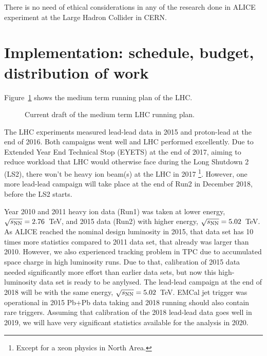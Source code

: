 There is no need of ethical considerations in any of the research done in ALICE experiment at the Large Hadron Collider in CERN.


\section{Implementation: schedule, budget, distribution of work} %
\label{sec:implementation}

Figure~\ref{fig:LHC-mid-term} shows the medium term running plan of the LHC. 
\begin{figure}[htbp]
   \centering
   \caption{Current draft of the medium term LHC running plan.}
   \label{fig:LHC-mid-term}
\end{figure}
The LHC experiments measured lead-lead data in 2015 and proton-lead at the end of 2016. Both campaigns went well and LHC performed excellently. Due to Extended Year End Technical Stop (EYETS) at the end of 2017, aiming to reduce workload that LHC would otherwise face during the Long Shutdown 2 (LS2), there won't be heavy ion beam(s) at the LHC in 2017 \footnote{Except for a xeon physics in North Area.}. However, one more lead-lead campaign will take place at the end of Run2 in December 2018, before the LS2 starts.

Year 2010 and 2011 heavy ion data (Run1) was taken at lower energy, $\sqrt{s_{\rm NN}}=2.76$~TeV, and 2015 data (Run2) with higher energy, $\sqrt{s_{\rm NN}}=5.02$~TeV. As ALICE reached the nominal design luminosity in 2015, that data set has 10 times more statistics compared to 2011 data set, that already was larger than 2010. However, we also experienced tracking problem in TPC due to accumulated space charge in high luminosity runs. Due to that, calibration of 2015 data needed significantly more effort than earlier data sets, but now this high-luminosity data set is ready to be anylysed. The lead-lead campaign at the end of 2018 will be with the same energy, $\sqrt{s_{\rm NN}}=5.02$~TeV. EMCal jet trigger was operational in 2015 Pb+Pb data taking and 2018 running should also contain rare triggers. Assuming that calibration of the 2018 lead-lead data goes well in 2019, we will have very significant statistics available for the analysis in 2020.

